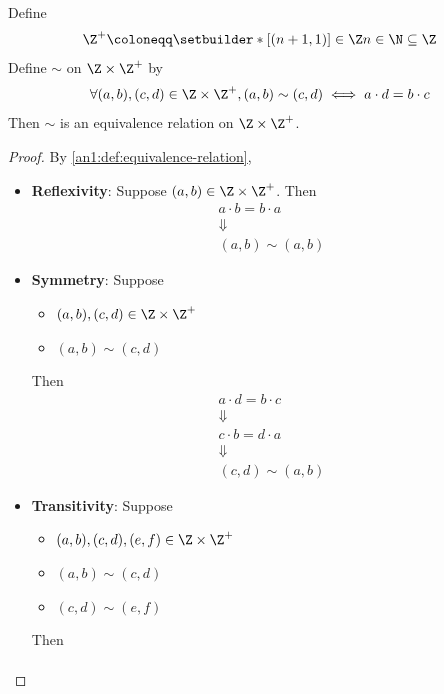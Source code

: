 \begin{theorem} \label{an1:thm:rational-construction-relation-is-equivalence}
  Define
  \[
    \Z^{+} \coloneqq \setbuilder*{[(n + 1, 1)] \in \Z}{n \in \N} \subseteq \Z
  \]
  Define $\sim$ on $\Z \times \Z^{+}$ by
  \[
    \forall (a, b), (c, d) \in \Z \times \Z^{+}, (a, b) \sim (c, d) \iff a \cdot d = b \cdot c
  \]
  Then $\sim$ is an equivalence relation on $\Z \times \Z^{+}$.
\end{theorem}

\begin{proof}
  By \cref{an1:def:equivalence-relation},
  \begin{itemize}
    \item \textbf{Reflexivity}: Suppose $(a, b) \in \Z \times \Z^{+}$. Then
          \[
            \begin{array}{c}
              a \cdot b = b \cdot a \\
              \Downarrow            \\
              (a, b) \sim (a, b)
            \end{array}
          \]
    \item \textbf{Symmetry}: Suppose
          \begin{itemize}
            \item $(a, b), (c, d) \in \Z \times \Z^{+}$
            \item $(a, b) \sim (c, d)$
          \end{itemize}
          Then
          \[
            \begin{array}{c}
              a \cdot d = b \cdot c \\
              \Downarrow            \\
              c \cdot b = d \cdot a \\
              \Downarrow            \\
              (c, d) \sim (a, b)
            \end{array}
          \]
    \item \textbf{Transitivity}: Suppose
          \begin{itemize}
            \item $(a, b), (c, d), (e, f) \in \Z \times \Z^{+}$
            \item $(a, b) \sim (c, d)$
            \item $(c, d) \sim (e, f)$
          \end{itemize}
          Then
          \[
            \begin{array}{c}

\end{array}\]
\end{itemize}
\end{proof}
